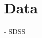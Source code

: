 \documentclass[modern]{aastex631}
\newcommand{\project}[1]{\textit{#1}}
\newcommand{\boss}{\project{BOSS}}
\newcommand{\todo}[1]{\textcolor{tab:red}{#1}}
\begin{document}





\section{Data}

- SDSS
\end{document}
